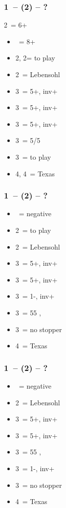 \documentclass[12pt, a4paper]{article}
\begin{document}
\subsubsection*{1\nt\ -- (2\diams\alrts) -- ?}
2\diams\ = 6+ \major
\begin{itemize}
    \item \dbl\ = 8+
    \item 2\hearts, 2\spades = to play
    \item 2\nt\ = Lebensohl
    \item 3\clubs\ = 5+\diams, inv+
    \item 3\diams\ = 5+\hearts, inv+
    \item 3\hearts\ = 5+\spades, inv+
    \item 3\spades\ = 5/5 \minor
    \item 3\nt\ = to play
    \item 4\diams, 4\hearts\ = Texas
\end{itemize}


\subsubsection*{1\nt\ -- (2\hearts) -- ?}
\begin{itemize}
    \item \dbl\ = negative
    \item 2\spades\ = to play
    \item 2\nt\ = Lebensohl
    \item 3\clubs\ = 5+\diams, inv+
    \item 3\diams\ = 5+\spades, inv+
    \item 3\hearts\ = 1-\hearts, inv+
    \item 3\spades\ = 55 \minor, \gf
    \item 3\nt\ = no \hearts stopper
    \item 4\hearts\ = Texas
\end{itemize}

\subsubsection*{1\nt\ -- (2\spades) -- ?}
\begin{itemize}
    \item \dbl\ = negative
    \item 2\nt\ = Lebensohl
    \item 3\clubs\ = 5+\diams, inv+
    \item 3\diams\ = 5+\hearts, inv+
    \item 3\hearts\ = 55 \minor, \gf
    \item 3\spades\ = 1-\spades, inv+
    \item 3\nt\ = no \spades stopper
    \item 4\diams\ = Texas
\end{itemize}
\end{document}
